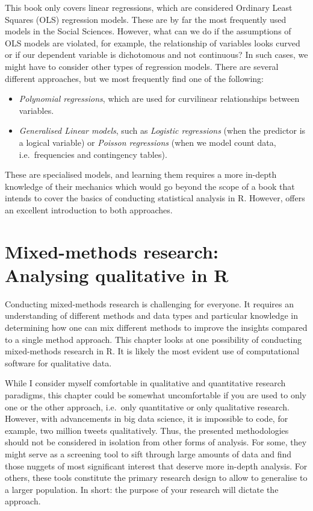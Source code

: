 \documentclass[
]{book}
\begin{document}
This book only covers linear regressions, which are considered Ordinary Least Squares (OLS) regression models. These are by far the most frequently used models in the Social Sciences. However, what can we do if the assumptions of OLS models are violated, for example, the relationship of variables looks curved or if our dependent variable is dichotomous and not continuous? In such cases, we might have to consider other types of regression models. There are several different approaches, but we most frequently find one of the following:

\begin{itemize}
\item
  \emph{Polynomial regressions}, which are used for curvilinear relationships between variables.
\item
  \emph{Generalised Linear models}, such as \emph{Logistic regressions} (when the predictor is a logical variable) or \emph{Poisson regressions} (when we model count data, i.e.~frequencies and contingency tables).
\end{itemize}

These are specialised models, and learning them requires a more in-depth knowledge of their mechanics which would go beyond the scope of a book that intends to cover the basics of conducting statistical analysis in R. However, \citep{cohen2014applied} offers an excellent introduction to both approaches.

\hypertarget{mixed-methods-research}{%
\chapter{Mixed-methods research: Analysing qualitative in R}\label{mixed-methods-research}}

Conducting mixed-methods research is challenging for everyone. It requires an understanding of different methods and data types and particular knowledge in determining how one can mix different methods to improve the insights compared to a single method approach. This chapter looks at one possibility of conducting mixed-methods research in R. It is likely the most evident use of computational software for qualitative data.

While I consider myself comfortable in qualitative and quantitative research paradigms, this chapter could be somewhat uncomfortable if you are used to only one or the other approach, i.e.~only quantitative or only qualitative research. However, with advancements in big data science, it is impossible to code, for example, two million tweets qualitatively. Thus, the presented methodologies should not be considered in isolation from other forms of analysis. For some, they might serve as a screening tool to sift through large amounts of data and find those nuggets of most significant interest that deserve more in-depth analysis. For others, these tools constitute the primary research design to allow to generalise to a larger population. In short: the purpose of your research will dictate the approach.
\end{document}
